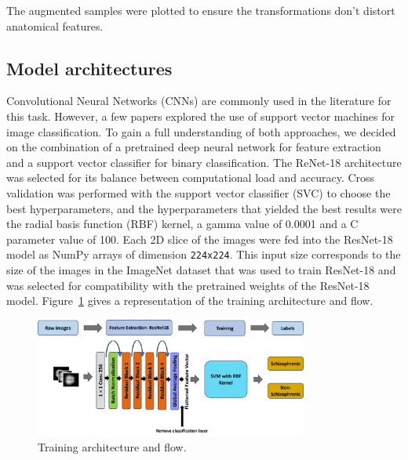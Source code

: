 \begin{itemize}
\end{itemize}

The augmented samples were plotted to ensure the transformations don't distort anatomical features.

%
\subsection{Model architectures}

Convolutional Neural Networks (CNNs) are commonly used in the literature for this task. However, a few papers explored the use of support vector machines for image classification. To gain a full understanding of both approaches, we decided on the combination of a pretrained deep neural network for feature extraction and a support vector classifier for binary classification. The ReNet-18 architecture was selected for its balance between computational load and accuracy. Cross validation was performed with the support vector classifier (SVC) to choose the best hyperparameters, and the hyperparameters that yielded the best results were the radial basis function (RBF) kernel, a gamma value of 0.0001 and a C parameter value of 100. Each 2D slice of the images were fed into the ResNet-18 model as NumPy arrays of dimension \texttt{224x224}. This input size corresponds to the size of the images in the ImageNet dataset that was used to train ResNet-18 and was selected for compatibility with the pretrained weights of the ResNet-18 model. Figure~\ref{fig:training_architecture} gives a representation of the training architecture and flow.
%
\begin{figure}
    \centering
    \includegraphics[width=0.8\textwidth]{./figs/model_architecture.png} %
    \caption{Training architecture and flow.}\label{fig:training_architecture}
\end{figure}

